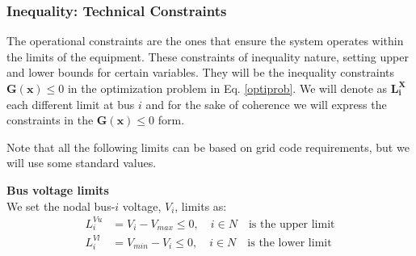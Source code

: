\documentclass[a4paper,11pt, titlepage, twoside]{article}
\begin{document}




\subsubsection{Inequality: Technical Constraints}\label{inequality}

The operational constraints are the ones that ensure the system operates within the limits of the equipment. These constraints of inequality nature, setting 
upper and lower bounds for certain variables. They will be the inequality constraints $\mathbf{G(x)} \leq 0$ in the optimization problem in  Eq. \ref{optiprob}. We will
denote as $\mathbf{L_i^X}$ each different limit at bus $i$ and for the sake of coherence we will express the constraints in the $\mathbf{G(x)} \leq 0$ form.\par
Note that all the following limits can be based on grid code requirements, but we will use some standard values.

\textbf{Bus voltage limits}\\
We set the nodal bus-$i$ voltage, $V_i$, limits as:
\begin{equation}
\begin{aligned}
    L_{i}^{Vu} &= V_i - V_{max} \leq 0, \quad i \in N \quad \text{is the upper limit} \\
    L_{i}^{Vl} &= V_{min} - V_i \leq 0, \quad i \in N \quad \text{is the lower limit}   
\end{aligned}    
\end{equation}
\end{document}
